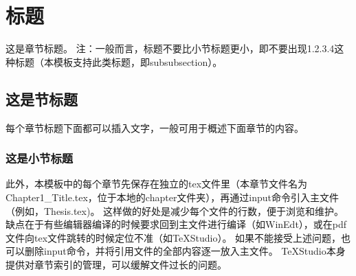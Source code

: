\chapter{标题}

这是章节标题。
注：一般而言，标题不要比小节标题更小，即不要出现1.2.3.4这种标题（本模板支持此类标题，即subsubsection）。

\section{这是节标题}

每个章节标题下面都可以插入文字，一般可用于概述下面章节的内容。

\subsection{这是小节标题}

此外，本模板中的每个章节先保存在独立的tex文件里（本章节文件名为Chapter1\_Title.tex，位于本地的chapter文件夹），再通过input命令引入主文件（例如，Thesis.tex)。
这样做的好处是减少每个文件的行数，便于浏览和维护。
缺点在于有些编辑器编译的时候要求回到主文件进行编译（如WinEdt），或在pdf文件向tex文件跳转的时候定位不准（如TeXStudio）。
如果不能接受上述问题，也可以删除input命令，并将引用文件的全部内容逐一放入主文件。
TeXStudio本身提供对章节索引的管理，可以缓解文件过长的问题。
